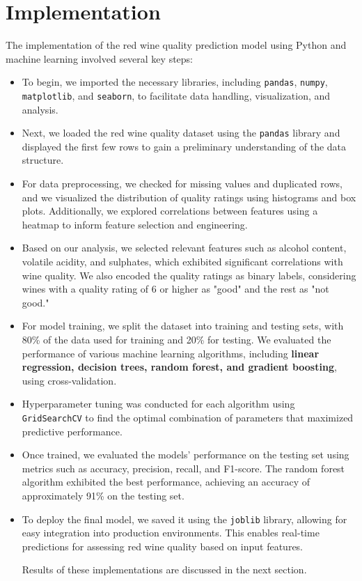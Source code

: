 \documentclass{article}
\begin{document}
\section{Implementation}

The implementation of the red wine quality prediction model using Python and machine learning involved several key steps:

\begin{itemize}
  \item To begin, we imported the necessary libraries, including \texttt{pandas}, \texttt{numpy}, \texttt{matplotlib}, and \texttt{seaborn}, to facilitate data handling, visualization, and analysis.

  \item Next, we loaded the red wine quality dataset using the \texttt{pandas} library and displayed the first few rows to gain a preliminary understanding of the data structure.

  \item For data preprocessing, we checked for missing values and duplicated rows, and we visualized the distribution of quality ratings using histograms and box plots. Additionally, we explored correlations between features using a heatmap to inform feature selection and engineering.

  \item Based on our analysis, we selected relevant features such as alcohol content, volatile acidity, and sulphates, which exhibited significant correlations with wine quality. We also encoded the quality ratings as binary labels, considering wines with a quality rating of 6 or higher as "good" and the rest as "not good."

  \item For model training, we split the dataset into training and testing sets, with 80\% of the data used for training and 20\% for testing. We evaluated the performance of various machine learning algorithms, including \textbf{linear regression, decision trees, random forest, and gradient boosting}, using cross-validation.

  \item Hyperparameter tuning was conducted for each algorithm using \texttt{GridSearchCV} to find the optimal combination of parameters that maximized predictive performance.

  \item Once trained, we evaluated the models' performance on the testing set using metrics such as accuracy, precision, recall, and F1-score. The random forest algorithm exhibited the best performance, achieving an accuracy of approximately 91\% on the testing set.

  \item To deploy the final model, we saved it using the \texttt{joblib} library, allowing for easy integration into production environments. This enables real-time predictions for assessing red wine quality based on input features.


  Results of these implementations are discussed in the next section.
\end{itemize}
\end{document}
